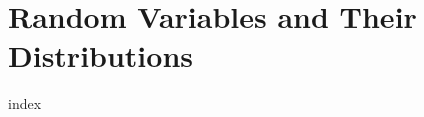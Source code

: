 \chapter{Random Variables and Their Distributions}
\label{ch:cp}
\ifdefined\HCode
\else
{
\startcontents[chapter]
}
\fi

{index}

\ifdefined\HCode
{}
\fi

\ifdefined\HCode
\else
{
\stopcontents[chapter]
}
\fi

\ifdefined\HCode
{}
\fi
